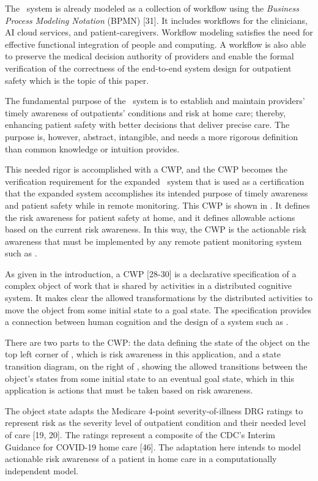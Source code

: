 The \phware\ system is already modeled as a collection of workflow using the \emph{Business Process Modeling Notation} (BPMN) [31]. It includes workflows for the clinicians, AI cloud services, and patient-caregivers. Workflow modeling satisfies the need for effective functional integration of people and computing. A workflow is also able to preserve the medical decision authority of providers and enable the formal verification of the correctness of the end-to-end system design for outpatient safety which is the topic of this paper.

The fundamental purpose of the \phware\ system is to establish and maintain providers' timely awareness of outpatients' conditions and risk at home care; thereby, enhancing patient safety with better decisions that deliver precise care. The purpose is, however, abstract, intangible, and needs a more rigorous definition than common knowledge or intuition provides. 

This needed rigor is accomplished with a CWP, and the CWP becomes the verification requirement for the expanded \phware\ system that is used as a certification that the expanded system accomplishes its intended purpose of timely awareness and patient safety while in remote monitoring. This CWP is shown in . It defines the risk awareness for patient safety at home, and it defines allowable actions based on the current risk awareness. In this way, the CWP is the actionable risk awareness that must be implemented by any remote patient monitoring system such as \phware. 

As given in the introduction, a CWP [28-30] is a declarative specification of a complex object of work that is shared by activities in a distributed cognitive system. It makes clear the allowed transformations by the distributed activities to move the object from some initial state to a goal state. The specification provides a connection between human cognition and the design of a system such as \phware.

There are two parts to the CWP: the data defining the state of the object on the top left corner of , which is risk awareness in this application, and a state transition diagram, on the right of , showing the allowed transitions between the object's states from some initial state to an eventual goal state, which in this application is actions that must be taken based on risk awareness.

The object state adapts the Medicare 4-point severity-of-illness DRG ratings to represent risk as the severity level of outpatient condition and their needed level of care [19, 20]. The ratings represent a composite of the CDC’s Interim Guidance for COVID-19 home care [46]. The adaptation here intends to model actionable risk awareness of a patient in home care in a computationally independent model. 


